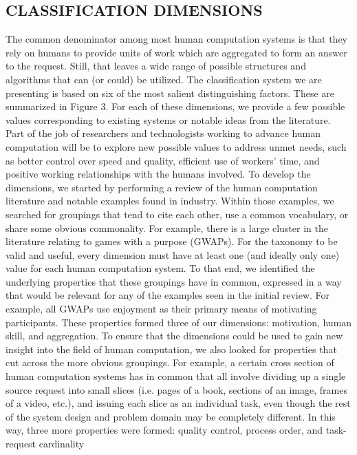 \documentclass{sig-alternate}
\begin{document}
\subsection*{CLASSIFICATION DIMENSIONS}
The common denominator among most human computation systems is that they rely on humans to provide units of work which are aggregated to form an answer to the request. Still, that leaves a wide range of possible structures and algorithms that can (or could) be utilized.
The classification system we are presenting is based on six of the most salient distinguishing factors. These are summarized in Figure 3. For each of these dimensions, we provide a few possible values corresponding to existing systems or notable ideas from the literature. Part of the job of researchers and technologists working to advance human computation will be to explore new possible values to address unmet needs, such as better control over speed and quality, efficient use of workers’ time, and positive working relationships with the humans involved.
To develop the dimensions, we started by performing a review of the human computation literature and notable examples found in industry. Within those examples, we searched for groupings that tend to cite each other, use a common vocabulary, or share some obvious commonality. For example, there is a large cluster in the literature relating to games with a purpose (GWAPs).
For the taxonomy to be valid and useful, every dimension must have at least one (and ideally only one) value for each human computation system. To that end, we identified the underlying properties that these groupings have in common, expressed in a way that would be relevant for any of the examples seen in the initial review. For example, all GWAPs use enjoyment as their primary means of motivating participants. These properties formed three of our dimensions: motivation, human skill, and aggregation.
To ensure that the dimensions could be used to gain new insight into the field of human computation, we also looked for properties that cut across the more obvious groupings. For example, a certain cross section of human computation systems has in common that all involve dividing up a single source request into small slices (i.e. pages of a book, sections of an image, frames of a video, etc.), and issuing each slice as an individual task, even though the rest of the system design and problem domain may be completely different. In this way, three more properties were formed: quality control, process order, and task-request cardinality
\end{document}
